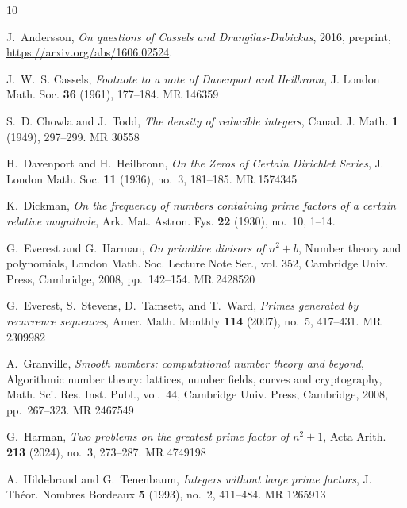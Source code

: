\documentclass[a4paper,11pt]{amsart}
\theoremstyle{definition}
\numberwithin{equation}{section}
\begin{document}
\providecommand{\bysame}{\leavevmode\hbox to3em{\hrulefill}\thinspace}
\providecommand{\MR}{\relax\ifhmode\unskip\space\fi MR }
\providecommand{\MRhref}[2]{%
  \href{http://www.ams.org/mathscinet-getitem?mr=#1}{#2}
}
\providecommand{\href}[2]{#2}
\begin{thebibliography}{10}

J.~Andersson, \emph{On questions of {C}assels and {D}rungilas-{D}ubickas},
  2016, preprint, \url{https://arxiv.org/abs/1606.02524}.

J.~W.~S. Cassels, \emph{Footnote to a note of {D}avenport and {H}eilbronn}, J.
  London Math. Soc. \textbf{36} (1961), 177--184. \MR{146359}

S.~D. Chowla and J.~Todd, \emph{The density of reducible integers}, Canad. J.
  Math. \textbf{1} (1949), 297--299. \MR{30558}

H.~Davenport and H.~Heilbronn, \emph{On the {Z}eros of {C}ertain {D}irichlet
  {S}eries}, J. London Math. Soc. \textbf{11} (1936), no.~3, 181--185.
  \MR{1574345}

K.~Dickman, \emph{On the frequency of numbers containing prime factors of a
  certain relative magnitude}, Ark. Mat. Astron. Fys. \textbf{22} (1930),
  no.~10, 1--14.

G.~Everest and G.~Harman, \emph{On primitive divisors of {$n^2+b$}}, Number
  theory and polynomials, London Math. Soc. Lecture Note Ser., vol. 352,
  Cambridge Univ. Press, Cambridge, 2008, pp.~142--154. \MR{2428520}

G.~Everest, S.~Stevens, D.~Tamsett, and T.~Ward, \emph{Primes generated by
  recurrence sequences}, Amer. Math. Monthly \textbf{114} (2007), no.~5,
  417--431. \MR{2309982}

A.~Granville, \emph{Smooth numbers: computational number theory and beyond},
  Algorithmic number theory: lattices, number fields, curves and cryptography,
  Math. Sci. Res. Inst. Publ., vol.~44, Cambridge Univ. Press, Cambridge, 2008,
  pp.~267--323. \MR{2467549}

G.~Harman, \emph{Two problems on the greatest prime factor of {$n^2+1$}}, Acta
  Arith. \textbf{213} (2024), no.~3, 273--287. \MR{4749198}

A.~Hildebrand and G.~Tenenbaum, \emph{Integers without large prime factors}, J.
  Th\'eor. Nombres Bordeaux \textbf{5} (1993), no.~2, 411--484. \MR{1265913}


\end{thebibliography}
\end{document}
